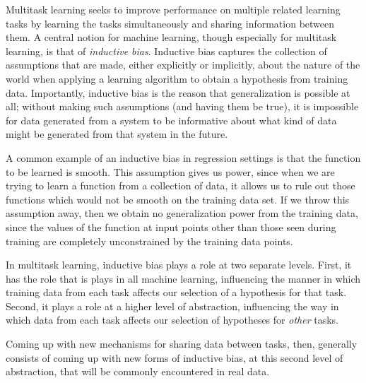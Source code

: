 \documentclass[letterpaper]{article}
\begin{document}
\noindent

Multitask learning seeks to improve performance on multiple related learning tasks by learning the tasks simultaneously and sharing information between them. A central notion for machine learning, though especially for multitask learning, is that of \textit{inductive bias}. Inductive bias captures the collection of assumptions that are made, either explicitly or implicitly, about the nature of the world when applying a learning algorithm to obtain a hypothesis from training data. Importantly, inductive bias is the reason that generalization is possible at all; without making such assumptions (and having them be true), it is impossible for data generated from a system to be informative about what kind of data might be generated from that system in the future.

A common example of an inductive bias in regression settings is that the function to be learned is smooth. This assumption gives us power, since when we are trying to learn a function from a collection of data, it allows us to rule out those functions which would not be smooth on the training data set. If we throw this assumption away, then we obtain no generalization power from the training data, since the values of the function at input points other than those seen during training are completely unconstrained by the training data points.

In multitask learning, inductive bias plays a role at two separate levels. First, it has the role that is plays in all machine learning, influencing the manner in which training data from each task affects our selection of a hypothesis for that task. Second, it plays a role at a higher level of abstraction, influencing the way in which data from each task affects our selection of hypotheses for \textit{other} tasks.

Coming up with new mechanisms for sharing data between tasks, then, generally consists of coming up with new forms of inductive bias, at this second level of abstraction, that will be commonly encountered in real data.
\end{document}

